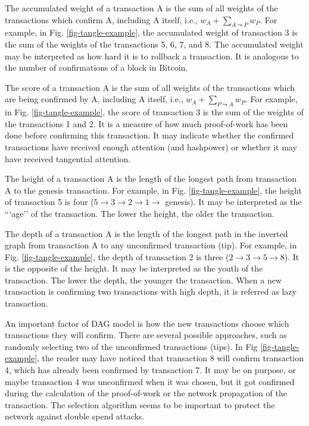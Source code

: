 The accumulated weight of a transaction A is the sum of all weights of the transactions which confirm A, including A itself, i.e., $w_A + \sum_{A \leadsto P} w_P$. For example, in Fig. \ref{fig-tangle-example}, the accumulated weight of transaction 3 is the sum of the weights of the transactions 5, 6, 7, and 8. The accumulated weight may be interpreted as how hard it is to rollback a transaction. It is analogous to the number of confirmations of a block in Bitcoin.

The score of a transaction A is the sum of all weights of the transactions which are being confirmed by A, including A itself, i.e., $w_A + \sum_{P \leadsto A} w_P$. For example, in Fig. \ref{fig-tangle-example}, the score of transaction 3 is the sum of the weights of the transactions 1 and 2. It is a measure of how much proof-of-work has been done before confirming this transaction. It may indicate whether the confirmed transactions have received enough attention (and hashpower) or whether it may have received tangential attention.

The height of a transaction A is the length of the longest path from transaction A to the genesis transaction. For example, in Fig. \ref{fig-tangle-example}, the height of transaction 5 is four ($5 \rightarrow 3 \rightarrow 2 \rightarrow 1 \rightarrow$ genesis). It may be interpreted as the “`age'' of the transaction. The lower the height, the older the transaction.

The depth of a transaction A is the length of the longest path in the inverted graph from transaction A to any unconfirmed transaction (tip). For example, in Fig. \ref{fig-tangle-example}, the depth of transaction 2 is three ($2 \rightarrow 3 \rightarrow 5 \rightarrow 8$). It is the opposite of the height. It may be interpreted as the youth of the transaction. The lower the depth, the younger the transaction. When a new transaction is confirming two transactions with high depth, it is referred as lazy transaction.

An important factor of DAG model is how the new transactions choose which transactions they will confirm. There are several possible approaches, such as randomly selecting two of the unconfirmed transactions (tips). In Fig \ref{fig-tangle-example}, the reader may have noticed that transaction 8 will confirm transaction 4, which has already been confirmed by transaction 7. It may be on purpose, or maybe transaction 4 was unconfirmed when it was chosen, but it got confirmed during the calculation of the proof-of-work or the network propagation of the transaction. The selection algorithm seems to be important to protect the network against double spend attacks.

